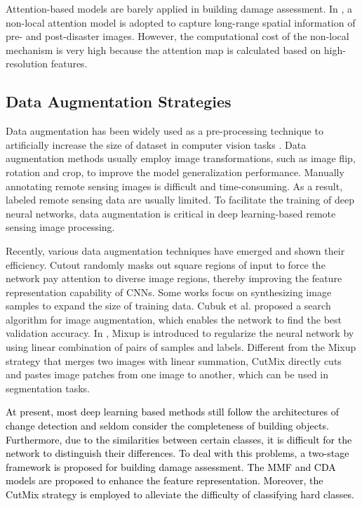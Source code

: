 \documentclass[journal]{IEEEtran}
\begin{document}
Attention-based models are barely applied in building damage assessment. In \cite{hao2020attention}, a non-local attention model \cite{wang2018non} is adopted to capture long-range spatial information of pre- and post-disaster images. However, the computational cost of the non-local mechanism is very high because the attention map is calculated based on high-resolution features. 


\subsection{Data Augmentation Strategies}
Data augmentation has been widely used as a pre-processing technique to artificially increase the size of dataset in computer vision tasks \cite{takahashiDataAugmentationUsing2020, myronenko20183d, liDataAugmentationHyperspectral2019}. Data augmentation methods usually employ image transformations, such as image flip, rotation and crop, to improve the model generalization performance. Manually annotating remote sensing images is difficult and time-consuming. As a result, labeled remote sensing data are usually limited. To facilitate the training of deep neural networks, data augmentation is critical in deep learning-based remote sensing image processing.

Recently, various data augmentation techniques have emerged and shown their efficiency. 
Cutout \cite{devries2017improved} randomly masks out square regions of input to force the network pay attention to diverse image regions, thereby improving the feature representation capability of CNNs.
Some works focus on synthesizing image samples to expand the size of training data. Cubuk et al. \cite{cubuk2019autoaugment} proposed a search algorithm for image augmentation, which enables the network to find the best validation accuracy. In \cite{zhang2018mixup}, Mixup is introduced to regularize the neural network by using linear combination of pairs of samples and labels. Different from the Mixup strategy that merges two images with linear summation, CutMix \cite{yun2019cutmix} directly cuts and pastes image patches from one image to another, which can be used in segmentation tasks.

\textcolor{black}{At present, most deep learning based methods still follow the architectures of change detection and seldom consider the completeness of building objects. Furthermore, due to the similarities between certain classes, it is difficult for the network to distinguish their differences. To deal with this problems, a two-stage framework is proposed for building damage assessment. The MMF and CDA models are proposed to enhance the feature representation. Moreover, the CutMix strategy is employed to alleviate the difficulty of classifying hard classes.}
\end{document}

